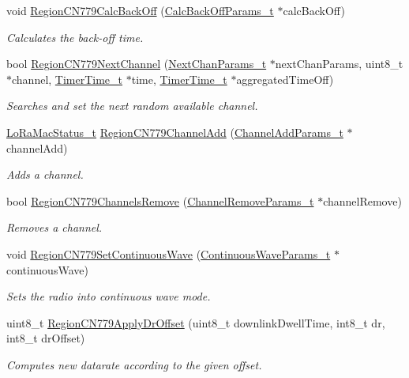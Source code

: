 \begin{DoxyCompactItemize}
void \hyperlink{group__REGIONCN779_ga159d16a30e948dcab70399897672848b}{Region\+C\+N779\+Calc\+Back\+Off} (\hyperlink{group__REGION_ga7c5c9a8da174e6679eded8257dc92fd9}{Calc\+Back\+Off\+Params\+\_\+t} $\ast$calc\+Back\+Off)
\begin{DoxyCompactList}\small\item\em Calculates the back-\/off time. \end{DoxyCompactList}\item 
bool \hyperlink{group__REGIONCN779_ga6506624bcb6ec8ae3e13e97d32301aaf}{Region\+C\+N779\+Next\+Channel} (\hyperlink{group__REGION_ga115f5e83afae352c0a3dcdc193374040}{Next\+Chan\+Params\+\_\+t} $\ast$next\+Chan\+Params, uint8\+\_\+t $\ast$channel, \hyperlink{utilities_8h_a4215ca43d3e953099ea758ce428599d0}{Timer\+Time\+\_\+t} $\ast$time, \hyperlink{utilities_8h_a4215ca43d3e953099ea758ce428599d0}{Timer\+Time\+\_\+t} $\ast$aggregated\+Time\+Off)
\begin{DoxyCompactList}\small\item\em Searches and set the next random available channel. \end{DoxyCompactList}\item 
\hyperlink{group__LORAMAC_ga30bd25657e10480f8605ee951b0ecfbd}{Lo\+Ra\+Mac\+Status\+\_\+t} \hyperlink{group__REGIONCN779_ga087a9e4729bae8b825db62caca5f20d2}{Region\+C\+N779\+Channel\+Add} (\hyperlink{group__REGION_gab1c5f3aa06614283202906cef4417860}{Channel\+Add\+Params\+\_\+t} $\ast$channel\+Add)
\begin{DoxyCompactList}\small\item\em Adds a channel. \end{DoxyCompactList}\item 
bool \hyperlink{group__REGIONCN779_ga3ea3d4f5fe7cb25f562f4e6f95396eed}{Region\+C\+N779\+Channels\+Remove} (\hyperlink{group__REGION_gaa37468560d2fc81a977b57a48e5d72c0}{Channel\+Remove\+Params\+\_\+t} $\ast$channel\+Remove)
\begin{DoxyCompactList}\small\item\em Removes a channel. \end{DoxyCompactList}\item 
void \hyperlink{group__REGIONCN779_ga702d0d0348fdbcb2b66f7e9d5fb93a61}{Region\+C\+N779\+Set\+Continuous\+Wave} (\hyperlink{group__REGION_gaf39bb5ba06921139c6d17f88a8d518cd}{Continuous\+Wave\+Params\+\_\+t} $\ast$continuous\+Wave)
\begin{DoxyCompactList}\small\item\em Sets the radio into continuous wave mode. \end{DoxyCompactList}\item 
uint8\+\_\+t \hyperlink{group__REGIONCN779_gab03fbee2e88e81b71c04f907af8b283e}{Region\+C\+N779\+Apply\+Dr\+Offset} (uint8\+\_\+t downlink\+Dwell\+Time, int8\+\_\+t dr, int8\+\_\+t dr\+Offset)
\begin{DoxyCompactList}\small\item\em Computes new datarate according to the given offset. \end{DoxyCompactList}\end{DoxyCompactItemize}


